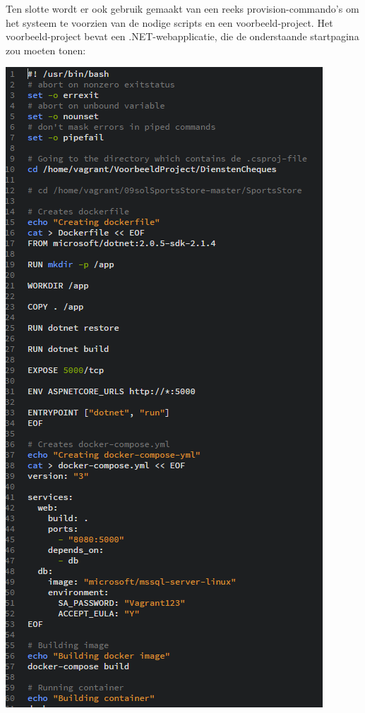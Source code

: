 Ten slotte wordt er ook gebruik gemaakt van een reeks provision-commando's om het systeem te voorzien van de nodige scripts en een voorbeeld-project. Het voorbeeld-project bevat een .NET-webapplicatie, die de onderstaande startpagina zou moeten tonen:

\begin{center}
	\includegraphics[scale=0.6]{img/centosapplicaties01}
\end{center}

